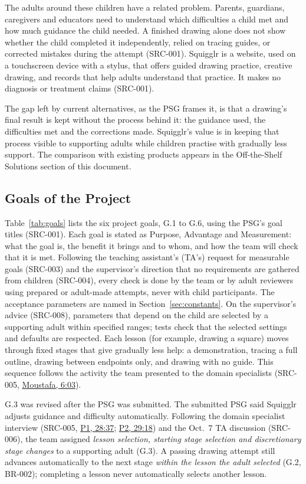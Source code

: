 \documentclass[12pt]{article}
\renewcommand{\_}{\textunderscore\allowbreak}%
\newcommand{\intlink}[3]{\hyperref[int:#1-#2]{#3}}
\newcommand{\intref}[2]{\intlink{#1}{#2}{#1, #2}}
\begin{document}
The adults around these children have a related problem. Parents, guardians,
caregivers and educators need to understand which difficulties a child met and
how much guidance the child needed. A finished drawing alone does not show
whether the child completed it independently, relied on tracing guides, or
corrected mistakes during the attempt (SRC-001). Squigglr is a website, used on
a touchscreen device with a stylus, that offers guided drawing practice,
creative drawing, and records that help adults understand that practice. It
makes no diagnosis or treatment claims (SRC-001).

The gap left by current alternatives, as the PSG frames it, is that a drawing's
final result is kept without the process behind it: the guidance used, the
difficulties met and the corrections made. Squigglr's value is in keeping that
process visible to supporting adults while children practise with gradually less
support. The comparison with existing products appears in the Off-the-Shelf
Solutions section of this document.

\subsection{Goals of the Project}

Table~\ref{tab:goals} lists the six project goals, G.1 to G.6, using the PSG's
goal titles (SRC-001). Each goal is stated as Purpose, Advantage and
Measurement: what the goal is, the benefit it brings and to whom, and how the
team will check that it is met. Following the teaching assistant's (TA's)
request for measurable goals (SRC-003) and the supervisor's direction that no
requirements are gathered from children (SRC-004), every check is done by the
team or by adult reviewers using prepared or adult-made attempts, never with
child participants. The acceptance parameters are named in
Section~\ref{sec:constants}. On the supervisor's advice (SRC-008), parameters
that depend on the child are selected by a supporting adult within specified
ranges; tests check that the selected settings and defaults are respected. Each
lesson (for example, drawing a square) moves through fixed stages that give
gradually less help: a demonstration, tracing a full outline, drawing between
endpoints only, and drawing with no guide. This sequence follows the activity
the team presented to the domain specialists (SRC-005, \intref{Moustafa}{6:03}).

G.3 was revised after the PSG was submitted. The submitted PSG said Squigglr
adjusts guidance and difficulty automatically. Following the domain specialist
interview (SRC-005, \intref{P1}{28:37}; \intref{P2}{29:18}) and the Oct.~7 TA
discussion (SRC-006), the team assigned \emph{lesson selection, starting stage
selection and discretionary stage changes} to a supporting adult (G.3). A
passing drawing attempt still advances automatically to the next stage
\emph{within the lesson the adult selected} (G.2, BR-002); completing a lesson
never automatically selects another lesson.
\end{document}
